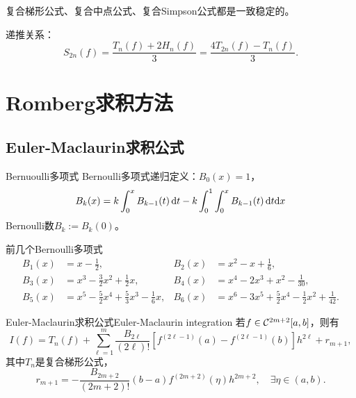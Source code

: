 \begin{remark}
    复合梯形公式、复合中点公式、复合Simpson公式都是一致稳定的。
\end{remark}

\begin{corollary}
    递推关系：
    \begin{equation}
        S_{2n}(f)=\frac{T_n(f)+2H_n(f)}3=\frac{4T_{2n}(f)-T_n(f)}3.
    \end{equation}
\end{corollary}

\section{Romberg求积方法}
\label{sec:Romberg's method}

\subsection{Euler-Maclaurin求积公式}

\begin{definition}
    {Bernuoulli多项式}{}
    Bernoulli多项式递归定义：$B_0(x)=1$，
    \begin{equation}
        B_k(x)=k\int_0^xB_{k-1}(t)\mathop{}\!\mathrm{d} t-k\int_0^1\int_0^xB_{k-1}(t)\mathop{}\!\mathrm{d} t\mathrm{d} x
    \end{equation}
    Bernoulli数$B_k:=B_k(0)$。
\end{definition}

\begin{example}
    {前几个Bernoulli多项式}{}
    \begin{equation*}
        \begin{aligned}
            B_1(x)&=x-\frac12,&B_2(x)&=x^2-x+\frac16,\\
            B_3(x)&=x^3-\frac32x^2+\frac12x,&B_4(x)&=x^4-2x^3+x^2-\frac1{30},\\
            B_5(x)&=x^5-\frac52x^4+\frac53x^3-\frac16x,&B_6(x)&=x^6-3x^5+\frac52x^4-\frac12x^2+\frac1{42}.
        \end{aligned}
    \end{equation*}
\end{example}

\begin{theorem}
    {Euler-Maclaurin求积公式}{Euler-Maclaurin integration}
    若$f\in\mathcal C^{2m+2}[a,b]$，则有
    \begin{equation}
        I(f)=T_n(f)+\sum_{\ell=1}^m\frac{B_{2\ell}}{(2\ell)!}[f^{(2\ell-1)}(a)-f^{(2\ell-1)}(b)]h^{2\ell}+r_{m+1},
    \end{equation}
    其中$T_n$是复合梯形公式，
    \begin{equation}
        r_{m+1}=-\frac{B_{2m+2}}{(2m+2)!}(b-a)f^{(2m+2)}(\eta)h^{2m+2},\quad\exists\eta\in(a,b).
    \end{equation}
\end{theorem}

